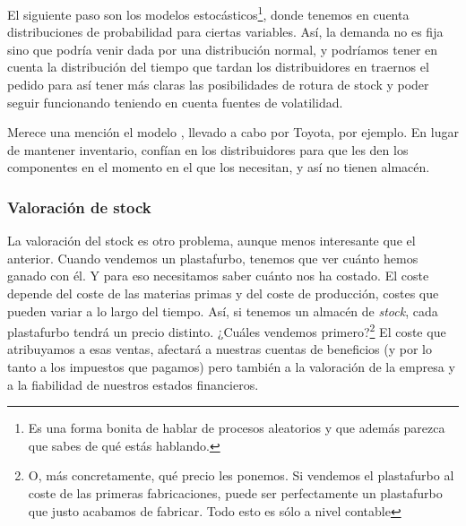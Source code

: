 \documentclass[nochap,palatino,shortheader]{apuntes}
\begin{document}
El siguiente paso son los modelos estocásticos\footnote{Es una forma bonita de hablar de procesos aleatorios y que además parezca que sabes de qué estás hablando.}, donde tenemos en cuenta distribuciones de probabilidad para ciertas variables. Así, la demanda no es fija sino que podría venir dada por una distribución normal, y podríamos tener en cuenta la distribución del tiempo que tardan los distribuidores en traernos el pedido para así tener más claras las posibilidades de rotura de stock y poder seguir funcionando teniendo en cuenta fuentes de volatilidad.

Merece una mención el modelo , llevado a cabo por Toyota, por ejemplo. En lugar de mantener inventario, confían en los distribuidores para que les den los componentes en el momento en el que los necesitan, y así no tienen almacén.

\subsubsection{Valoración de stock}

La valoración del stock es otro problema, aunque menos interesante que el anterior. Cuando vendemos un plastafurbo, tenemos que ver cuánto hemos ganado con él. Y para eso necesitamos saber cuánto nos ha costado. El coste depende del coste de las materias primas y del coste de producción, costes que pueden variar a lo largo del tiempo. Así, si tenemos un almacén de \textit{stock}, cada plastafurbo tendrá un precio distinto. ¿Cuáles vendemos primero?\footnote{O, más concretamente, qué precio les ponemos. Si vendemos el plastafurbo al coste de las primeras fabricaciones, puede ser perfectamente un plastafurbo que justo acabamos de fabricar. Todo esto es sólo a nivel contable } El coste que atribuyamos a esas ventas, afectará a nuestras cuentas de beneficios (y por lo tanto a los impuestos que pagamos) pero también a la valoración de la empresa y a la fiabilidad de nuestros estados financieros.
\end{document}

